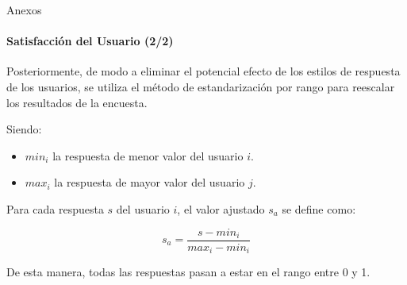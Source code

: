 \begin{frame}{Anexos}
\framesubtitle{Satisfacci\'on del Usuario (2/2)}
Posteriormente, de modo a eliminar el potencial efecto de los estilos de respuesta
de los usuarios, se utiliza el m\'etodo de estandarizaci\'on 
por rango para reescalar los resultados de la encuesta.

Siendo:
\begin{itemize}
	\item $min_i$ la respuesta de menor valor del usuario $i$.
	\item $max_i$ la respuesta de mayor valor del usuario $j$.
\end{itemize}

Para cada respuesta $s$ del usuario $i$, el valor ajustado $s_a$ se define como:

\begin{equation*}
s_a=\frac{s-min_i}{max_i-min_i}
\end{equation*}


De esta manera, todas las respuestas pasan a estar en el rango entre 0 y 1.  
\end{frame}